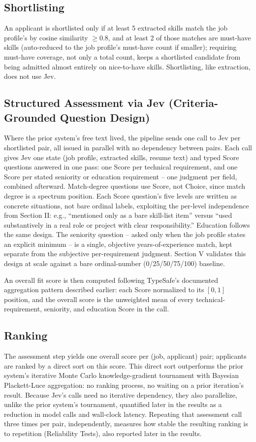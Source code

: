 \documentclass[journal]{IEEEtran}
\begin{document}
\subsection{Shortlisting}
An applicant is shortlisted only if at least 5 extracted skills match the job profile's by cosine similarity $\geq$0.8, and at least 2 of those matches are must-have skills (auto-reduced to the job profile's must-have count if smaller); requiring must-have coverage, not only a total count, keeps a shortlisted candidate from being admitted almost entirely on nice-to-have skills. Shortlisting, like extraction, does not use Jev.

\subsection{Structured Assessment via Jev (Criteria-Grounded Question Design)}
Where the prior system's free text lived, the pipeline sends one call to Jev per shortlisted pair, all issued in parallel with no dependency between pairs. Each call gives Jev one state (job profile, extracted skills, resume text) and typed Score questions answered in one pass: one Score per technical requirement, and one Score per stated seniority or education requirement -- one judgment per field, combined afterward.
Match-degree questions use Score, not Choice, since match degree is a spectrum position. Each Score question's five levels are written as concrete situations, not bare ordinal labels, exploiting the per-level independence from Section II: e.g., ``mentioned only as a bare skill-list item'' versus ``used substantively in a real role or project with clear responsibility.'' Education follows the same design. The seniority question -- asked only when the job profile states an explicit minimum -- is a single, objective years-of-experience match, kept separate from the subjective per-requirement judgment. Section V validates this design at scale against a bare ordinal-number (0/25/50/75/100) baseline.

An overall fit score is then computed following TypeSafe's documented aggregation pattern described earlier: each Score normalized to its $[0,1]$ position, and the overall score is the unweighted mean of every technical-requirement, seniority, and education Score in the call.

\subsection{Ranking}
The assessment step yields one overall score per (job, applicant) pair; applicants are ranked by a direct sort on this score. This direct sort outperforms the prior system's iterative Monte Carlo knowledge-gradient tournament with Bayesian Plackett-Luce aggregation: no ranking process, no waiting on a prior iteration's result. Because Jev's calls need no iterative dependency, they also parallelize, unlike the prior system's tournament, quantified later in the results as a reduction in model calls and wall-clock latency. Repeating that assessment call three times per pair, independently, measures how stable the resulting ranking is to repetition (Reliability Tests), also reported later in the results.
\end{document}
